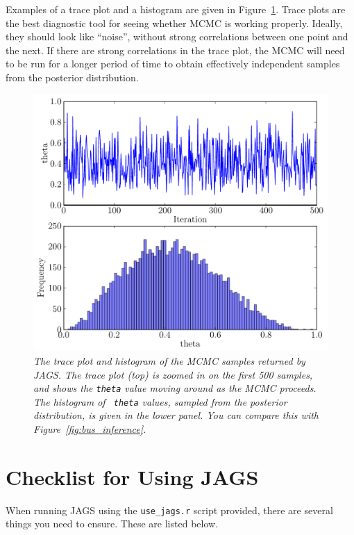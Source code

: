 Examples of a trace plot and a histogram are given in Figure~\ref{fig:results}.
Trace plots are the best diagnostic tool for seeing whether MCMC is working
properly. Ideally, they should look like ``noise'', without strong correlations
between one point and the next. If there are strong correlations in the
trace plot, the MCMC will need to be run for a longer period of time to obtain
effectively independent samples from the posterior distribution.

\begin{figure}[ht!]
\begin{center}
\includegraphics[scale=0.5]{Figures/jags_example.pdf}
\caption{\it The trace plot and histogram of the MCMC samples returned by
JAGS. The trace plot (top) is zoomed in on the first 500 samples, and shows the
{\tt theta} value moving around as the MCMC proceeds. The histogram of {\tt
theta} values, sampled from the posterior distribution, is given in the lower
panel. You can compare this with Figure~\ref{fig:bus_inference}.
\label{fig:results}}
\end{center}
\end{figure}

\section{Checklist for Using JAGS}
When running JAGS using the {\tt use\_jags.r} script provided, there are several
things you need to ensure. These are listed below.

